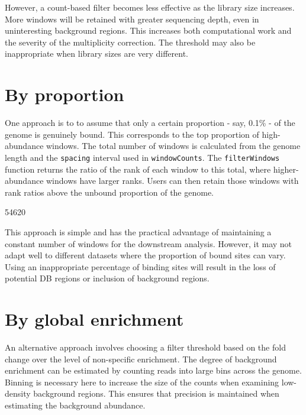 \documentclass[12pt]{report}
\renewenvironment{Schunk}{\vspace{0pt}}{\vspace{0pt}}
\newcommand{\code}[1]{{\small\texttt{#1}}}
\begin{document}
However, a count-based filter becomes less effective as the library size increases.
More windows will be retained with greater sequencing depth, even in uninteresting background regions.
This increases both computational work and the severity of the multiplicity correction.
The threshold may also be inappropriate when library sizes are very different.

\section{By proportion}
One approach is to to assume that only a certain proportion - say, 0.1\% - of the genome is genuinely bound. 
This corresponds to the top proportion of high-abundance windows.
The total number of windows is calculated from the genome length and the \code{spacing} interval used in \code{windowCounts}. 
The \code{filterWindows} function returns the ratio of the rank of each window to this total, where higher-abundance windows have larger ranks.
Users can then retain those windows with rank ratios above the unbound proportion of the genome.

\begin{Schunk}
\begin{Soutput}
[1] 54620
\end{Soutput}
\end{Schunk}

This approach is simple and has the practical advantage of maintaining a constant number of windows for the downstream analysis. 
However, it may not adapt well to different datasets where the proportion of bound sites can vary.
Using an inappropriate percentage of binding sites will result in the loss of potential DB regions or inclusion of background regions.

\section{By global enrichment}
\label{sec:global_filter}
An alternative approach involves choosing a filter threshold based on the fold change over the level of non-specific enrichment.
The degree of background enrichment can be estimated by counting reads into large bins across the genome.
Binning is necessary here to increase the size of the counts when examining low-density background regions. 
This ensures that precision is maintained when estimating the background abundance.
\end{document}
